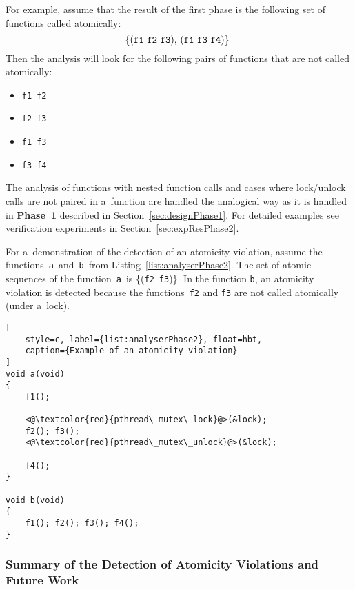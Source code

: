 \begin{example}
    For example, assume that the result of the first phase is the following
    set of functions called atomically:
    $$
        \text{%
            \{(\texttt{f1}~\texttt{f2}~\texttt{f3}),
            (\texttt{f1}~\texttt{f3}~\texttt{f4})\}
        }
    $$
    Then the analysis will look
    for the following pairs of functions that are not called atomically:
    \begin{itemize}
        \item \texttt{f1}~\texttt{f2}
        \item \texttt{f2}~\texttt{f3}
        \item \texttt{f1}~\texttt{f3}
        \item \texttt{f3}~\texttt{f4}
    \end{itemize}
\end{example}

The analysis of functions with nested function calls and cases
where lock/unlock calls are not paired in a~function are handled
the analogical way as it is handled in \textbf{Phase~1} described in
Section~\ref{sec:designPhase1}. For detailed examples see verification
experiments in Section~\ref{sec:expResPhase2}.

\begin{example}
    For a~demonstration of the detection of an atomicity violation, assume
    the functions~\texttt{a}~and~\texttt{b}~from
    Listing~\ref{list:analyserPhase2}. The set of atomic sequences of the
    function~\texttt{a}~is \{(\texttt{f2}~\texttt{f3})\}. In the function
    \texttt{b}, an atomicity violation is detected because the
    functions~\texttt{f2} and \texttt{f3} are not called atomically (under
    a~lock).
\end{example}

\begin{lstlisting}[
    style=c, label={list:analyserPhase2}, float=hbt,
    caption={Example of an atomicity violation}
]
void a(void)
{
    f1();

    <@\textcolor{red}{pthread\_mutex\_lock}@>(&lock);
    f2(); f3();
    <@\textcolor{red}{pthread\_mutex\_unlock}@>(&lock);

    f4();
}

void b(void)
{
    f1(); f2(); f3(); f4();
}
\end{lstlisting}

\subsubsection{%
    Summary of the Detection of Atomicity Violations and Future Work
}

